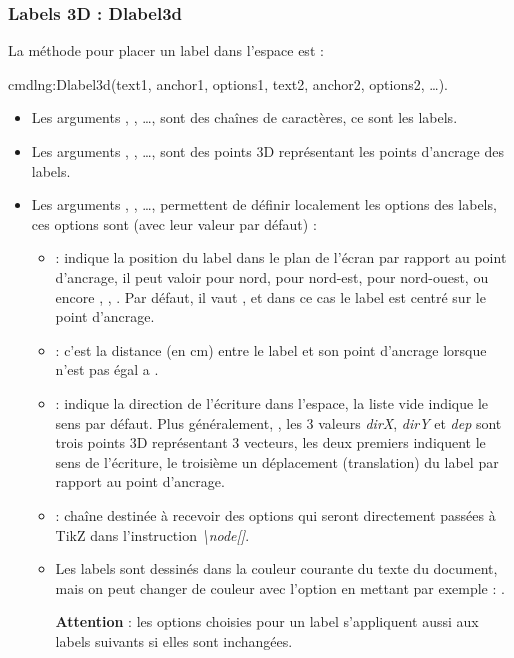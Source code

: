 \subsubsection{Labels 3D : Dlabel3d}

La méthode pour placer un label dans l'espace est :

cmdln{g:Dlabel3d(text1, anchor1, options1, text2, anchor2, options2, \ldots).}

    \begin{itemize}
    \item  Les arguments , , \ldots, sont des chaînes de caractères, ce sont les labels.
    \item  Les arguments , , \ldots, sont des points 3D représentant les points d'ancrage des labels.
    \item  Les arguments , , \ldots,  permettent de définir localement les options des labels, ces options sont (avec leur valeur par défaut) :

        \begin{itemize}
            \item {} : indique la position du label dans le plan de l'écran par rapport au point d'ancrage, il peut valoir  pour nord,  pour nord-est,  pour nord-ouest, ou encore , , . Par défaut, il vaut , et dans ce cas le label est centré sur le point  d'ancrage.
            
            \item {} : c'est la distance (en cm) entre le label et son point d'ancrage lorsque  n'est pas égal a .
            
            \item {} : indique la direction de l'écriture dans l'espace, la liste vide indique le sens par défaut. Plus généralement, , les 3 valeurs \emph{dirX}, \emph{dirY} et \emph{dep} sont trois points 3D représentant 3 vecteurs, les deux premiers indiquent le sens de l'écriture, le troisième un déplacement (translation) du label par rapport au point d'ancrage.
            
            \item {} : chaîne destinée à recevoir des options qui seront directement passées à TikZ dans l'instruction \emph{\textbackslash node[]}.
            
            \item Les labels sont dessinés dans la couleur courante du texte du document, mais on peut changer de couleur avec l'option  en mettant par exemple : .
            
            \textbf{Attention} : les options choisies pour un label s'appliquent aussi aux labels suivants si elles sont inchangées.
        \end{itemize}
  \end{itemize}

